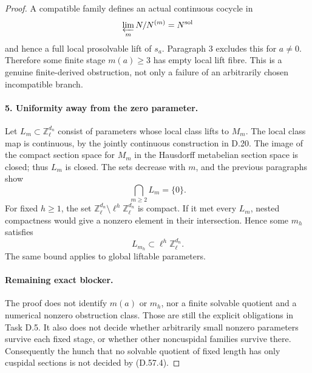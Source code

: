 \begin{proof}
A compatible family defines an actual continuous cocycle
in
\[
        \varprojlim_m N/N^{(m)}=N^{\rm sol}
\]
and hence a full local prosolvable lift of $s_a$.  Paragraph 3
excludes this for $a\ne0$.  Therefore some finite stage
$m(a)\ge3$ has empty local lift fibre.  This is a genuine
finite-derived obstruction, not only a failure of an
arbitrarily chosen incompatible branch.

\paragraph{5. Uniformity away from the zero parameter.}

Let $L_m\subset\mathbb Z_\ell^{d_n}$ consist of parameters
whose local class lifts to $M_m$.  The local class map is
continuous, by the jointly continuous construction in D.20.
The image of the compact section space for $M_m$ in the
Hausdorff metabelian section space is closed; thus $L_m$
is closed.  The sets decrease with $m$, and the previous
paragraphs show
\[
                           \bigcap_{m\ge2}L_m=\{0\}.
\]
For fixed $h\ge1$, the set
$\mathbb Z_\ell^{d_n}\setminus\ell^h\mathbb Z_\ell^{d_n}$
is compact.  If it met every $L_m$, nested compactness would
give a nonzero element in their intersection.  Hence some
$m_h$ satisfies
\[
                         L_{m_h}\subset\ell^h\mathbb Z_\ell^{d_n}.
                                                        \tag{D.57.4}
\]
The same bound applies to global liftable parameters.

\paragraph{Remaining exact blocker.}

The proof does not identify $m(a)$ or $m_h$, nor a finite
solvable quotient and a numerical nonzero obstruction class.
Those are still the explicit obligations in Task D.5.
It also does not decide whether arbitrarily small nonzero
parameters survive each fixed stage, or whether other
noncuspidal families survive there.  Consequently the hunch
that no solvable quotient of fixed length has only cuspidal
sections is not decided by (D.57.4).
\end{proof}
